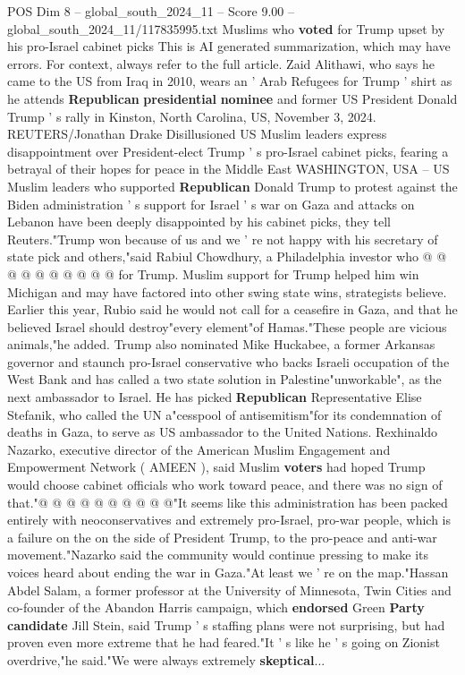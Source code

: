 \begin{textsample}{POS Dim 8 – global\_south\_2024\_11 – Score 9.00 – global\_south\_2024\_11/117835995.txt}  \label{ex:f8_pos_148}
Muslims who \textbf{voted} for Trump upset by his pro-Israel cabinet picks This is AI generated summarization, which may have errors.
For context, always refer to the full article.
Zaid Alithawi, who says he came to the US from Iraq in 2010, wears an ' Arab Refugees for Trump ' shirt as he attends \textbf{Republican} \textbf{presidential} \textbf{nominee} and former US President Donald Trump ' s rally in Kinston, North Carolina, US, November 3, 2024.
REUTERS/Jonathan Drake Disillusioned US Muslim leaders express disappointment over President-elect Trump ' s pro-Israel cabinet picks, fearing a betrayal of their hopes for peace in the Middle East WASHINGTON, USA -- US Muslim leaders who supported \textbf{Republican} Donald Trump to protest against the Biden administration ' s support for Israel ' s war on Gaza and attacks on Lebanon have been deeply disappointed by his cabinet picks, they tell Reuters."Trump won because of us and we ' re not happy with his secretary of state pick and others,"said Rabiul Chowdhury, a Philadelphia investor who @ @ @ @ @ @ @ @ @ @ for Trump.
Muslim support for Trump helped him win Michigan and may have factored into other swing state wins, strategists believe.
Earlier this year, Rubio said he would not call for a ceasefire in Gaza, and that he believed Israel should destroy"every element"of Hamas."These people are vicious animals,"he added.
Trump also nominated Mike Huckabee, a former Arkansas governor and staunch pro-Israel conservative who backs Israeli occupation of the West Bank and has called a two state solution in Palestine"unworkable", as the next ambassador to Israel.
He has picked \textbf{Republican} Representative Elise Stefanik, who called the UN a"cesspool of antisemitism"for its condemnation of deaths in Gaza, to serve as US ambassador to the United Nations.
Rexhinaldo Nazarko, executive director of the American Muslim Engagement and Empowerment Network ( AMEEN ), said Muslim \textbf{voters} had hoped Trump would choose cabinet officials who work toward peace, and there was no sign of that."@ @ @ @ @ @ @ @ @ @"It seems like this administration has been packed entirely with neoconservatives and extremely pro-Israel, pro-war people, which is a failure on the on the side of President Trump, to the pro-peace and anti-war movement."Nazarko said the community would continue pressing to make its voices heard about ending the war in Gaza."At least we ' re on the map."Hassan Abdel Salam, a former professor at the University of Minnesota, Twin Cities and co-founder of the Abandon Harris campaign, which \textbf{endorsed} Green \textbf{Party} \textbf{candidate} Jill Stein, said Trump ' s staffing plans were not surprising, but had proven even more extreme that he had feared."It ' s like he ' s going on Zionist overdrive,"he said."We were always extremely \textbf{skeptical}...

\end{textsample}
